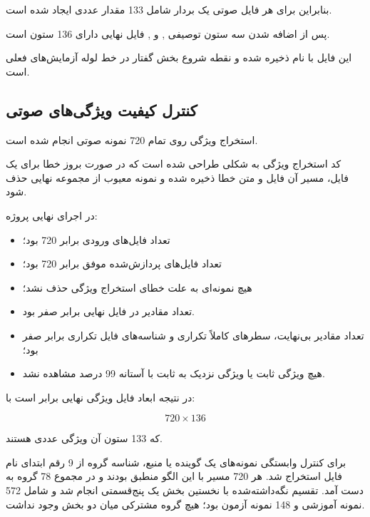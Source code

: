 بنابراین برای هر فایل صوتی یک بردار شامل 133 مقدار عددی ایجاد شده است.

پس از اضافه شدن سه ستون توصیفی
,
و
,
فایل نهایی دارای 136 ستون است.

این فایل با نام
ذخیره شده و نقطه شروع بخش گفتار در خط لوله آزمایش‌های فعلی است.


\subsection{کنترل کیفیت ویژگی‌های صوتی}

استخراج ویژگی روی تمام 720 نمونه صوتی انجام شده است.

کد استخراج ویژگی به شکلی طراحی شده است که در صورت بروز خطا برای یک فایل، مسیر آن فایل و متن خطا ذخیره شده و نمونه معیوب از مجموعه نهایی حذف شود.

در اجرای نهایی پروژه:

\begin{itemize}

	\item تعداد فایل‌های ورودی برابر 720 بود؛

	\item تعداد فایل‌های پردازش‌شده موفق برابر 720 بود؛

	\item هیچ نمونه‌ای به علت خطای استخراج ویژگی حذف نشد؛

	\item تعداد مقادیر
	در فایل نهایی برابر صفر بود.

	\item تعداد مقادیر بی‌نهایت، سطرهای کاملاً تکراری و شناسه‌های فایل تکراری برابر صفر بود؛

	\item هیچ ویژگی ثابت یا ویژگی نزدیک به ثابت با آستانه 99 درصد مشاهده نشد.

\end{itemize}

در نتیجه ابعاد فایل ویژگی نهایی برابر است با:

\begin{equation}
720\times136
\end{equation}

که 133 ستون آن ویژگی عددی هستند.

برای کنترل وابستگی نمونه‌های یک گوینده یا منبع، شناسه گروه از 9 رقم ابتدای نام فایل استخراج شد. هر 720 مسیر با این الگو منطبق بودند و در مجموع 78 گروه به دست آمد. تقسیم نگه‌داشته‌شده با نخستین بخش یک
پنج‌قسمتی انجام شد و شامل 572 نمونه آموزشی و 148 نمونه آزمون بود؛ هیچ گروه مشترکی میان دو بخش وجود نداشت.


